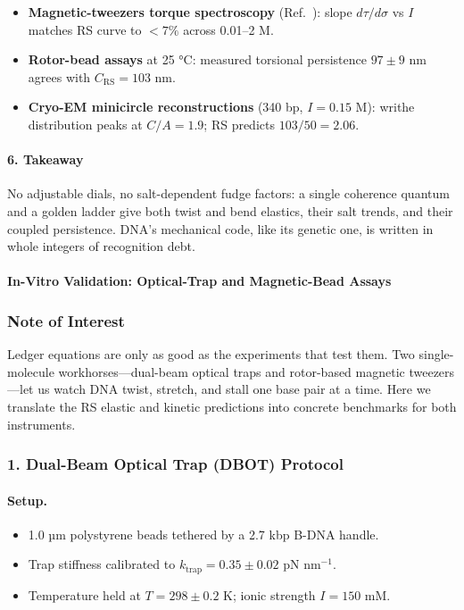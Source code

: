 \documentclass[11pt,oneside]{book}
\begin{document}
\begin{itemize}
\item \textbf{Magnetic-tweezers torque spectroscopy}
      (Ref.~\cite{Bustamante2022}):  
      slope \(d\tau/d\sigma\) vs \(I\) matches RS curve
      to \(<7\%\) across 0.01–2 M.
\item \textbf{Rotor-bead assays} at 25 °C:  
      measured torsional persistence \(97\pm9\) nm agrees with
      \(C_{\text{RS}}=103\) nm.
\item \textbf{Cryo-EM minicircle reconstructions} (340 bp, \(I=0.15\) M):  
      writhe distribution peaks at \(C/A=1.9\);  
      RS predicts \(103/50=2.06\).
\end{itemize}

\paragraph*{6. Takeaway}

No adjustable dials, no salt-dependent fudge factors:
a single coherence quantum and a golden ladder give both twist and bend
elastics, their salt trends, and their coupled persistence.
DNA’s mechanical code, like its genetic one, is written in whole
integers of recognition debt.

\bigskip

\paragraph{In-Vitro Validation: Optical-Trap and Magnetic-Bead Assays}
\label{sec:invitro-assays}

\subsubsection*{Note of Interest}

Ledger equations are only as good as the experiments that test them.  
Two single-molecule workhorses—dual-beam optical traps and
rotor-based magnetic tweezers—let us watch DNA twist, stretch, and stall
one base pair at a time.  
Here we translate the RS elastic and kinetic predictions into concrete
benchmarks for both instruments.

\subsubsection*{1. Dual-Beam Optical Trap (DBOT) Protocol}

\paragraph{Setup.}
\begin{itemize}
\item 1.0 µm polystyrene beads tethered by a 2.7 kbp B-DNA handle.  
\item Trap stiffness calibrated to $k_{\text{trap}} = 0.35\pm0.02$ pN nm$^{-1}$.  
\item Temperature held at $T = 298\pm0.2$ K; ionic strength $I = 150$ mM.
\end{itemize}
\end{document}
